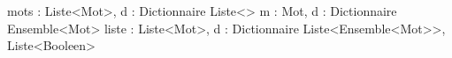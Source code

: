 \begin{algorithme}
		{mots : Liste<Mot>, d : Dictionnaire}%
		{Liste<\booleen>}
		{m : Mot, d : Dictionnaire}%
		{Ensemble<Mot>}%
		{liste : Liste<Mot>, d : Dictionnaire}%
		{Liste<Ensemble<Mot>>, Liste<Booleen>}%
\end{algorithme}
